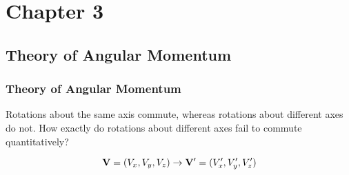 \section{Chapter 3}
\subsection{Theory of Angular Momentum}

\begin{frame}
	\frametitle{Theory of Angular Momentum}
	Rotations about the same axis commute, whereas rotations about different axes do not.
	How exactly do rotations about different axes fail to commute quantitatively?

	\[
		\vb V = (V_x, V_y, V_z) \to \vb V' = (V_x', V_y', V_z')
	\]

\end{frame}
